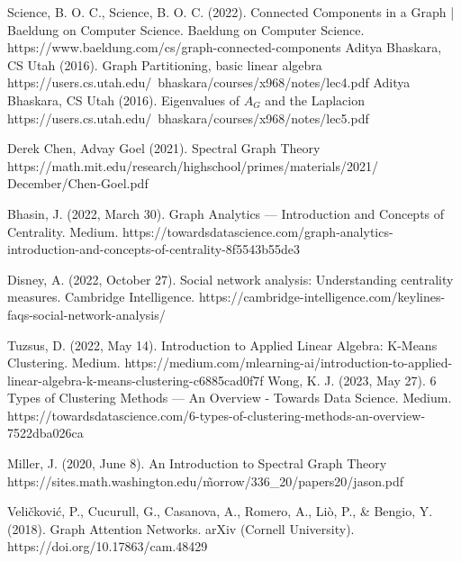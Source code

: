 \documentclass[12pt, a4paper]{article}
\begin{document}
    \begin{thebibliography}{9}
    Science, B. O. C., Science, B. O. C. (2022). Connected Components in a Graph | Baeldung on Computer Science. Baeldung on Computer Science. https://www.baeldung.com/cs/graph-connected-components
    Aditya Bhaskara, CS Utah (2016). Graph Partitioning, basic linear algebra https://users.cs.utah.edu/~bhaskara/courses/x968/notes/lec4.pdf
    Aditya Bhaskara, CS Utah (2016). Eigenvalues of $A_G$ and the Laplacion https://users.cs.utah.edu/~bhaskara/courses/x968/notes/lec5.pdf

    Derek Chen, Advay Goel (2021). Spectral Graph Theory https://math.mit.edu/research/highschool/primes/materials/2021/\\December/Chen-Goel.pdf

    Bhasin, J. (2022, March 30). Graph Analytics — Introduction and Concepts of Centrality. Medium. https://towardsdatascience.com/graph-analytics-introduction-and-concepts-of-centrality-8f5543b55de3

    Disney, A. (2022, October 27). Social network analysis: Understanding centrality measures. Cambridge Intelligence. https://cambridge-intelligence.com/keylines-faqs-social-network-analysis/

    Tuzsus, D. (2022, May 14). Introduction to Applied Linear Algebra: K-Means Clustering. Medium. https://medium.com/mlearning-ai/introduction-to-applied-linear-algebra-k-means-clustering-c6885cad0f7f
    Wong, K. J. (2023, May 27). 6 Types of Clustering Methods — An Overview - Towards Data Science. Medium. https://towardsdatascience.com/6-types-of-clustering-methods-an-overview-7522dba026ca

    Miller, J. (2020, June 8). An Introduction to Spectral Graph Theory https://sites.math.washington.edu/\~morrow/336\_20/papers20/jason.pdf

Veličković, P., Cucurull, G., Casanova, A., Romero, A., Liò, P., \& Bengio, Y. (2018). Graph Attention Networks. arXiv (Cornell University). https://doi.org/10.17863/cam.48429
    \end{thebibliography}
\end{document}
